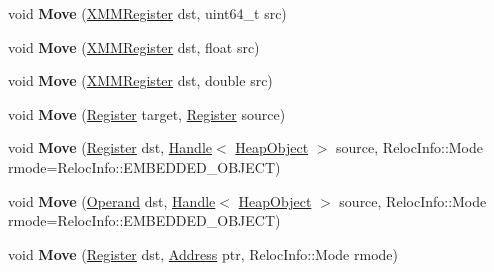 \begin{DoxyCompactItemize}
void {\bfseries Move} (\mbox{\hyperlink{classv8_1_1internal_1_1XMMRegister}{X\+M\+M\+Register}} dst, uint64\+\_\+t src)
\item 
\mbox{\label{classv8_1_1internal_1_1TurboAssembler_a0985fbd1d016c165d00e50d37cd4932c}} 
void {\bfseries Move} (\mbox{\hyperlink{classv8_1_1internal_1_1XMMRegister}{X\+M\+M\+Register}} dst, float src)
\item 
\mbox{\label{classv8_1_1internal_1_1TurboAssembler_af0a27ec3fd02eb87e129960fd011519d}} 
void {\bfseries Move} (\mbox{\hyperlink{classv8_1_1internal_1_1XMMRegister}{X\+M\+M\+Register}} dst, double src)
\item 
\mbox{\label{classv8_1_1internal_1_1TurboAssembler_ab2f42db65bbd943063d6e7fb81ef3e1b}} 
void {\bfseries Move} (\mbox{\hyperlink{classv8_1_1internal_1_1Register}{Register}} target, \mbox{\hyperlink{classv8_1_1internal_1_1Register}{Register}} source)
\item 
\mbox{\label{classv8_1_1internal_1_1TurboAssembler_ab5c4f403d9b2583960b8f998273dea99}} 
void {\bfseries Move} (\mbox{\hyperlink{classv8_1_1internal_1_1Register}{Register}} dst, \mbox{\hyperlink{classv8_1_1internal_1_1Handle}{Handle}}$<$ \mbox{\hyperlink{classv8_1_1internal_1_1HeapObject}{Heap\+Object}} $>$ source, Reloc\+Info\+::\+Mode rmode=Reloc\+Info\+::\+E\+M\+B\+E\+D\+D\+E\+D\+\_\+\+O\+B\+J\+E\+CT)
\item 
\mbox{\label{classv8_1_1internal_1_1TurboAssembler_ab36f445750bed35e53ec4a8145914cee}} 
void {\bfseries Move} (\mbox{\hyperlink{classv8_1_1internal_1_1Operand}{Operand}} dst, \mbox{\hyperlink{classv8_1_1internal_1_1Handle}{Handle}}$<$ \mbox{\hyperlink{classv8_1_1internal_1_1HeapObject}{Heap\+Object}} $>$ source, Reloc\+Info\+::\+Mode rmode=Reloc\+Info\+::\+E\+M\+B\+E\+D\+D\+E\+D\+\_\+\+O\+B\+J\+E\+CT)
\item 
\mbox{\label{classv8_1_1internal_1_1TurboAssembler_a389254422065415fb71315c25906e373}} 
void {\bfseries Move} (\mbox{\hyperlink{classv8_1_1internal_1_1Register}{Register}} dst, \mbox{\hyperlink{classuintptr__t}{Address}} ptr, Reloc\+Info\+::\+Mode rmode)

\end{DoxyCompactItemize}
